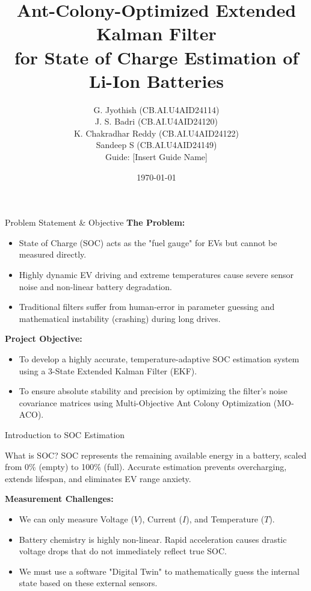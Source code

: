 \documentclass[aspectratio=169]{beamer}
\title[SOC Estimation via MO-ACO-EKF]{Ant-Colony-Optimized Extended Kalman Filter \\ for State of Charge Estimation of Li-Ion Batteries}
\author[Team]{%
    G. Jyothish (CB.AI.U4AID24114) \\
    J. S. Badri (CB.AI.U4AID24120) \\
    K. Chakradhar Reddy (CB.AI.U4AID24122) \\
    Sandeep S (CB.AI.U4AID24149) \\
    \vspace{0.3cm} \small Guide: [Insert Guide Name]%
}
\institute[Amrita Vishwa Vidyapeetham]{Department of Artificial Intelligence}
\date{\today}
\begin{document}
\begin{frame}
    \titlepage
\end{frame}

\begin{frame}{Problem Statement \& Objective}
    \textbf{The Problem:}
    \begin{itemize}
        \item State of Charge (SOC) acts as the "fuel gauge" for EVs but cannot be measured directly.
        \item Highly dynamic EV driving and extreme temperatures cause severe sensor noise and non-linear battery degradation.
        \item Traditional filters suffer from human-error in parameter guessing and mathematical instability (crashing) during long drives.
    \end{itemize}
    \vspace{0.5cm}
    \textbf{Project Objective:}
    \begin{itemize}
        \item To develop a highly accurate, temperature-adaptive SOC estimation system using a 3-State Extended Kalman Filter (EKF). 
        \item To ensure absolute stability and precision by optimizing the filter's noise covariance matrices using Multi-Objective Ant Colony Optimization (MO-ACO).
    \end{itemize}
\end{frame}

\begin{frame}{Introduction to SOC Estimation}
    \begin{block}{What is SOC?}
        SOC represents the remaining available energy in a battery, scaled from 0\% (empty) to 100\% (full). Accurate estimation prevents overcharging, extends lifespan, and eliminates EV range anxiety.
    \end{block}
    \vspace{0.3cm}
    \textbf{Measurement Challenges:}
    \begin{itemize}
        \item We can only measure Voltage ($V$), Current ($I$), and Temperature ($T$).
        \item Battery chemistry is highly non-linear. Rapid acceleration causes drastic voltage drops that do not immediately reflect true SOC.
        \item We must use a software "Digital Twin" to mathematically guess the internal state based on these external sensors.
    \end{itemize}
\end{frame}
\end{document}

